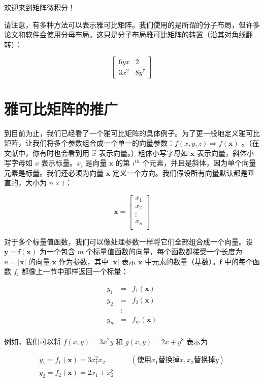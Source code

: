 \documentclass[lang=cn,newtx,10pt,scheme=chinese]{elegantbook}
\begin{document}
欢迎来到矩阵微积分！

请注意，有多种方法可以表示雅可比矩阵。我们使用的是所谓的分子布局，但许多论文和软件会使用分母布局。这只是分子布局雅可比矩阵的转置（沿其对角线翻转）：

\[
\begin{bmatrix}
	6yx & 2\\
	3x^2 & 8y^7
\end{bmatrix}
\]

\section{雅可比矩阵的推广}

到目前为止，我们已经看了一个雅可比矩阵的具体例子。为了更一般地定义雅可比矩阵，让我们将多个参数组合成一个单一的向量参数：$f(x, y, z) \Rightarrow f(\mathbf{x})$ 。（在文献中，你有时也会看到用 $\vec{x}$ 表示向量。）粗体小写字母如 $\mathbf{x}$ 表示向量，斜体小写字母如 $x$ 表示标量。$x_i$ 是向量 $\mathbf{x}$ 的第 $i^{th}$ 个元素，并且是斜体，因为单个向量元素是标量。我们还必须为向量 $\mathbf{x}$ 定义一个方向。我们假设所有向量默认都是垂直的，大小为 $n \times 1$：

\[\mathbf{x} = \begin{bmatrix}
           x_1\\
           x_2\\
           \vdots \\
           x_n\\
           \end{bmatrix}\]

对于多个标量值函数，我们可以像处理参数一样将它们全部组合成一个向量。设 $\mathbf{y} = \mathbf{f}(\mathbf{x})$ 为一个包含 $m$ 个标量值函数的向量，每个函数都接受一个长度为 $n=|\mathbf{x}|$ 的向量 $\mathbf{x}$ 作为参数，其中 $|\mathbf{x}|$ 表示 $\mathbf{x}$ 中元素的数量（基数）。$\mathbf{f}$ 中的每个函数 $f_i$ 都像上一节中那样返回一个标量：

\[
\begin{array}{lcl}
 y_1 & = & f_1(\mathbf{x})\\
 y_2 & = & f_2(\mathbf{x})\\
 & \vdots & \\
 y_m & = & f_m(\mathbf{x})\\
\end{array}\]

例如，我们可以将 $f(x,y) = 3x^2y$ 和 $g(x,y) = 2x + y^8$ 表示为

\[
\begin{array}{lllllllll}
 y_1 = f_1(\mathbf{x}) = 3x_1^2x_2  &&&(\text{使用}x_1 \text{替换掉}x, x_2 \text{替换掉}y)\\
 y_2 = f_2(\mathbf{x}) = 2x_1 + x_2^8
\end{array}
\]
\end{document}
